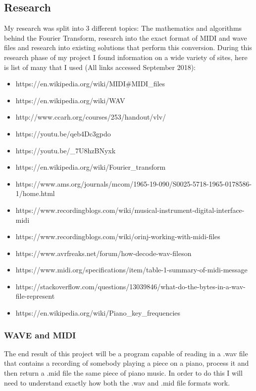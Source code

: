 \documentclass[12pt]{report}
\begin{document}
\subsection*{Research}
My research was split into 3 different topics: The mathematics and algorithms behind the Fourier Transform, research into the exact format of MIDI and wave files and research into existing solutions that perform this conversion.
 \newline
 \newline
During this research phase of my project I found information on a wide variety of sites, here is list of many that I used (All links accessed September 2018):\\
\begin{itemize}
    \color{blue}
    \item https://en.wikipedia.org/wiki/MIDI\#MIDI\_files
    \item https://en.wikipedia.org/wiki/WAV
    \item http://www.ccarh.org/courses/253/handout/vlv/
    \item https://youtu.be/qeb4Dc3gpdo
    \item https://youtu.be/\_7U8hzBNyxk
    \item https://en.wikipedia.org/wiki/Fourier\_transform
    \item https://www.ams.org/journals/mcom/1965-19-090/S0025-5718-1965-0178586-1/home.html
    \item https://www.recordingblogs.com/wiki/musical-instrument-digital-interface-midi
    \item https://www.recordingblogs.com/wiki/orinj-working-with-midi-files
    \item https://www.avrfreaks.net/forum/how-decode-wav-fileson
    \item https://www.midi.org/specifications/item/table-1-summary-of-midi-message
    \item https://stackoverflow.com/questions/13039846/what-do-the-bytes-in-a-wav-file-represent
    \item https://en.wikipedia.org/wiki/Piano\_key\_frequencies
\end{itemize}

\subsubsection*{WAVE and MIDI}

The end result of this project will be a program capable of reading in a .wav file that contains a recording of somebody playing a piece on a piano, process it and then return a .mid file the same piece of piano music. In order to do this I will need to understand exactly how both the .wav and .mid file formats work.
\end{document}

